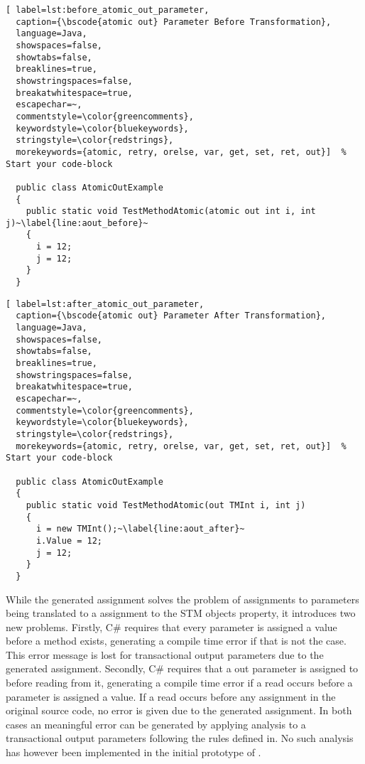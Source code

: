 \begin{lstlisting}[ label=lst:before_atomic_out_parameter,
  caption={\bscode{atomic out} Parameter Before Transformation},
  language=Java,  
  showspaces=false,
  showtabs=false,
  breaklines=true,
  showstringspaces=false,
  breakatwhitespace=true,
  escapechar=~,
  commentstyle=\color{greencomments},
  keywordstyle=\color{bluekeywords},
  stringstyle=\color{redstrings},
  morekeywords={atomic, retry, orelse, var, get, set, ret, out}]  % Start your code-block

  public class AtomicOutExample
  {
    public static void TestMethodAtomic(atomic out int i, int j)~\label{line:aout_before}~
    {
      i = 12;
      j = 12;
    }
  }
\end{lstlisting}

\begin{lstlisting}[ label=lst:after_atomic_out_parameter,
  caption={\bscode{atomic out} Parameter After Transformation},
  language=Java,  
  showspaces=false,
  showtabs=false,
  breaklines=true,
  showstringspaces=false,
  breakatwhitespace=true,
  escapechar=~,
  commentstyle=\color{greencomments},
  keywordstyle=\color{bluekeywords},
  stringstyle=\color{redstrings},
  morekeywords={atomic, retry, orelse, var, get, set, ret, out}]  % Start your code-block

  public class AtomicOutExample
  {
    public static void TestMethodAtomic(out TMInt i, int j)
    {
      i = new TMInt();~\label{line:aout_after}~
      i.Value = 12;
      j = 12;
    }
  }
\end{lstlisting}


While the generated assignment solves the problem of assignments to  parameters being translated to a assignment to the \ac{STM} objects  property, it introduces two new problems. Firstly, C\# requires that every  parameter is assigned a value before a method exists, generating a compile time error if that is not the case\cite[p. 94]{csharp2013specificaiton}. This error message is lost for transactional output parameters due to the generated assignment. Secondly, C\# requires that a out parameter is assigned to before reading from it\cite[p. 94]{csharp2013specificaiton}, generating a compile time error if a read occurs before a  parameter is assigned a value. If a read occurs before any assignment in the original source code, no error is given due to the generated assignment. In both cases an meaningful error can be generated by applying analysis to a transactional output parameters  following the rules defined in\cite[p. 95]{csharp2013specificaiton}. No such analysis has however been implemented in the initial prototype of \stmname.

